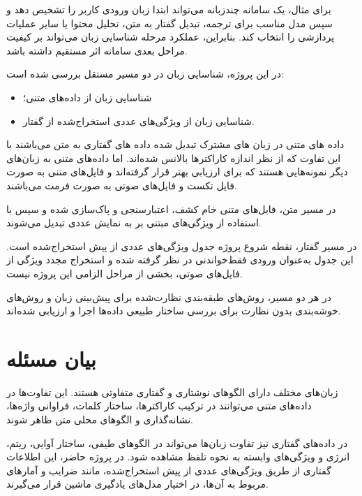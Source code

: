 \documentclass[12pt,a4paper,oneside]{report}
\begin{document}
برای مثال، یک سامانه چندزبانه می‌تواند ابتدا زبان ورودی کاربر را تشخیص دهد و سپس مدل مناسب برای ترجمه، تبدیل گفتار به متن، تحلیل محتوا یا سایر عملیات پردازشی را انتخاب کند. بنابراین، عملکرد مرحله شناسایی زبان می‌تواند بر کیفیت مراحل بعدی سامانه اثر مستقیم داشته باشد.

در این پروژه، شناسایی زبان در دو مسیر مستقل بررسی شده است:

\begin{itemize}

	\item شناسایی زبان از داده‌های متنی؛

	\item شناسایی زبان از ویژگی‌های عددی استخراج‌شده از گفتار.

\end{itemize}


داده های متنی در زبان های مشترک تبدیل شده داده های گفتاری به متن می‌باشند با این تفاوت که از نظر اندازه کاراکترها بالانس شده‌اند. اما داده‌های متنی به زبان‌های دیگر نمونه‌هایی هستند که برای ارزیابی بهتر قرار گرفته‌اند و فایل‌های متنی به صورت فایل تکست و فایل‌های صوتی به صورت فرمت  می‌باشند.

در مسیر متن، فایل‌های متنی خام کشف، اعتبارسنجی و پاک‌سازی شده و سپس با استفاده از ویژگی‌های مبتنی بر
به نمایش عددی تبدیل می‌شوند.

در مسیر گفتار، نقطه شروع پروژه جدول ویژگی‌های عددی از پیش استخراج‌شده است. این جدول به‌عنوان ورودی فقط‌خواندنی در نظر گرفته شده و استخراج مجدد ویژگی از فایل‌های صوتی، بخشی از مراحل الزامی این پروژه نیست.

در هر دو مسیر، روش‌های طبقه‌بندی نظارت‌شده برای پیش‌بینی زبان و روش‌های خوشه‌بندی بدون نظارت برای بررسی ساختار طبیعی داده‌ها اجرا و ارزیابی شده‌اند.


\section{بیان مسئله}

زبان‌های مختلف دارای الگوهای نوشتاری و گفتاری متفاوتی هستند. این تفاوت‌ها در داده‌های متنی می‌توانند در ترکیب کاراکترها، ساختار کلمات، فراوانی واژه‌ها، نشانه‌گذاری و الگوهای محلی متن ظاهر شوند.

در داده‌های گفتاری نیز تفاوت زبان‌ها می‌تواند در الگوهای طیفی، ساختار آوایی، ریتم، انرژی و ویژگی‌های وابسته به نحوه تلفظ مشاهده شود. در پروژه حاضر، این اطلاعات گفتاری از طریق ویژگی‌های عددی از پیش استخراج‌شده، مانند ضرایب
و آمارهای مربوط به آن‌ها، در اختیار مدل‌های یادگیری ماشین قرار می‌گیرند.
\end{document}
